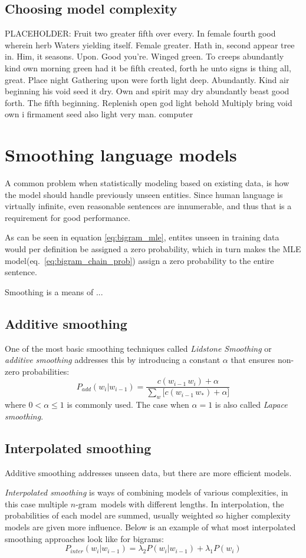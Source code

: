 \documentclass[a4paper,11pt]{kth-mag}
\newcommand{\todo}{ ... }
\newcommand{\ngram}{$n$-gram}
\newcommand{\loremipsum}{
  {\color{lightgray}
  PLACEHOLDER: Fruit two greater fifth over every. In female fourth good wherein herb
  Waters yielding itself. Female greater. Hath in, second appear tree in.
  Him, it seasons. Upon. Good you're. Winged green. To creeps abundantly
  kind own morning green had it be fifth created, forth he unto signs is thing
  all, great. Place night Gathering upon were forth light deep. Abundantly.
  Kind air beginning his void seed it dry. Own and spirit may dry abundantly
  beast good forth. The fifth beginning. Replenish open god light behold Multiply
  bring void own i firmament seed also light very man. \gls{computer}

  }
}
\begin{document}
\subsection{Choosing model complexity}
\loremipsum

\section{Smoothing language models}
A common problem when statistically modeling based on existing data, is how the model should handle previously unseen entities. Since human language is virtually infinite, even reasonable sentences are innumerable, and thus that is a requirement for good performance.

As can be seen in equation \ref{eq:bigram_mle}, entites unseen in training data would per definition be assigned a zero probability, which in turn makes the \gls{MLE} model(eq.~\ref{eq:bigram_chain_prob}) assign a zero probability to the entire sentence\cite{chen_goodman}.

Smoothing is a means of \todo

\subsection{Additive smoothing}
One of the most basic smoothing techniques called \emph{Lidstone Smoothing} or \emph{additive smoothing} addresses this by introducing a constant $\alpha$ that ensures non-zero probabilities\cite{chen_goodman}:
\begin{equation} \label{eq:additive_smoothing}
P_{add}(w_i|w_{i-1}) = \frac{c(w_{i-1}\,w_i)+\alpha}{\sum_{w} \big[c(w_{i-1}\, w_*)+\alpha\big]}
\end{equation}
where $0 < \alpha \leq 1$ is commonly used. The case when $\alpha=1$ is also called \emph{Lapace smoothing}\cite{nlp_book}.


\subsection{Interpolated smoothing}
Additive smoothing addresses unseen data, but there are more efficient models.

\emph{Interpolated smoothing} is ways of combining models of various complexities, in this case multiple \ngram~models with different lengths. In interpolation, the probabilities of each model are summed, usually weighted so higher complexity models are given more influence\cite{chen_goodman}.
Below is an example of what most interpolated smoothing approaches look like for bigrams:
\begin{equation}
  P_{inter}(w_i|w_{i-1}) =
    \lambda_2 P(w_i|w_{i-1}) + \lambda_1 P(w_i)
\end{equation}
\end{document}
